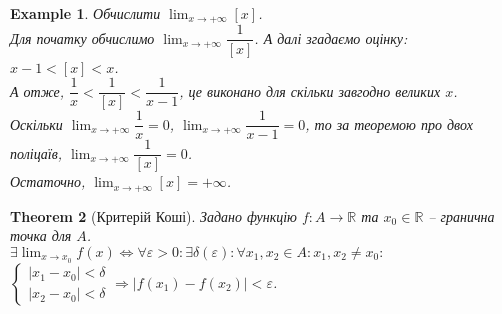 \documentclass[a4paper, 14pt]{article}
\theoremstyle{theoremdd}
\newtheorem{theorem}{Theorem}[subsection]
\theoremstyle{theoremdd}
\theoremstyle{theoremdd}
\theoremstyle{theoremdd}
\newtheorem{example}[theorem]{Example}
\theoremstyle{theoremdd}
\theoremstyle{theoremdd}
\theoremstyle{theoremdd}
\theoremstyle{theoremdd}
\begin{document}
	\begin{example}
	Обчислити $\displaystyle\lim_{x \to +\infty} [x]$.\\
	
	Для початку обчислимо $\displaystyle\lim_{x \to +\infty} \dfrac{1}{[x]}$. А далі згадаємо оцінку: $x-1 < [x] < x$.\\
	А отже, $\dfrac{1}{x} < \dfrac{1}{[x]} < \dfrac{1}{x-1}$, це виконано для скільки завгодно великих $x$.\\
	Оскільки $\displaystyle\lim_{x \to + \infty} \dfrac{1}{x} = 0$, $\displaystyle\lim_{x \to + \infty} \dfrac{1}{x-1} = 0$, то за теоремою про двох поліцаїв, $\displaystyle\lim_{x \to +\infty} \dfrac{1}{[x]} = 0$.\\
	Остаточно, $\displaystyle\lim_{x \to +\infty} [x] = +\infty$.
	\end{example}
	
	\begin{theorem}[Критерій Коші]
Задано функцію $f \colon A \to \mathbb{R}$ та $x_0 \in \mathbb{R}$ -- гранична точка для $A$.\\
$\exists \displaystyle \lim_{x \to x_0} f(x) \iff \forall \varepsilon > 0: \exists \delta(\varepsilon): \forall x_1,x_2 \in A: x_1,x_2 \neq x_0:$ 
$\begin{cases} |x_1-x_0|<\delta \\ |x_2-x_0|<\delta \end{cases} \Rightarrow |f(x_1)-f(x_2)|<\varepsilon
$.
	\end{theorem}
	
\end{document}
